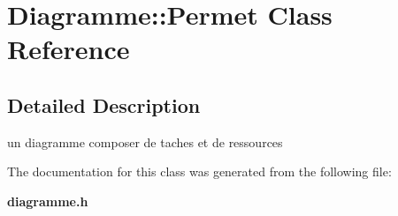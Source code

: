 \section{Diagramme\-:\-:Permet Class Reference}
\label{class_diagramme_1_1_permet}


\subsection{Detailed Description}
un diagramme composer de taches et de ressources 

The documentation for this class was generated from the following file\-:\begin{DoxyCompactItemize}
\item 
{\bf diagramme.\-h}\end{DoxyCompactItemize}
